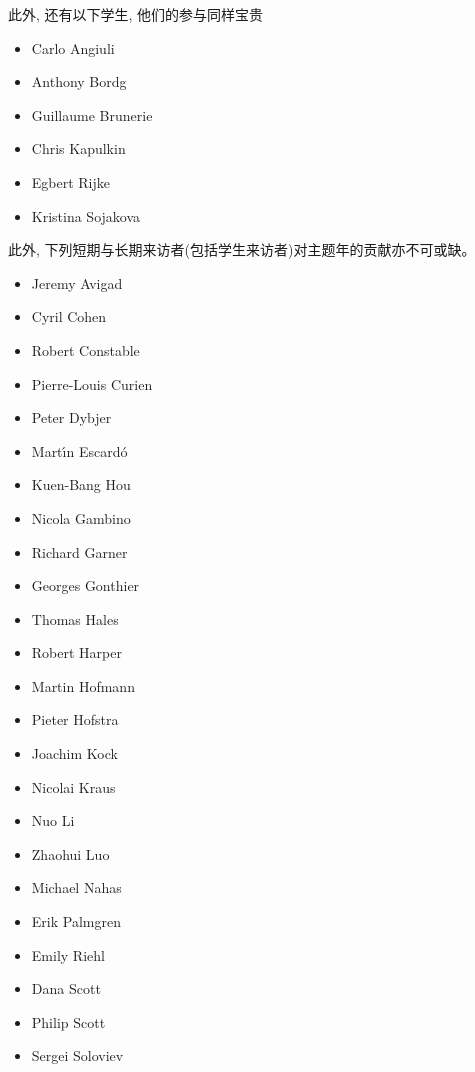 \noindent 此外, 还有以下学生, 他们的参与同样宝贵

\begin{multicols}{\OPTprefacecols}{
\begin{itemize}
\item[] Carlo Angiuli
\item[] Anthony Bordg
\item[] Guillaume Brunerie
\item[] Chris Kapulkin
\item[] Egbert Rijke
\item[] Kristina Sojakova
\end{itemize}
}
\end{multicols}

\noindent 此外, 下列短期与长期来访者(包括学生来访者)对主题年的贡献亦不可或缺。

\begin{multicols}{\OPTprefacecols}{
\begin{itemize}
\item[] Jeremy Avigad
\item[] Cyril Cohen
\item[] Robert Constable
\item[] Pierre-Louis Curien
\item[] Peter Dybjer
\item[] Mart{\'\i}n Escard{\'o}
\item[] Kuen-Bang Hou
\item[] Nicola Gambino
\item[] Richard Garner
\item[] Georges Gonthier
\item[] Thomas Hales
\item[] Robert Harper
\item[] Martin Hofmann
\item[] Pieter Hofstra
\item[] Joachim Kock
\item[] Nicolai Kraus
\item[] Nuo Li
\item[] Zhaohui Luo
\item[] Michael Nahas
\item[] Erik Palmgren
\item[] Emily Riehl
\item[] Dana Scott
\item[] Philip Scott
\item[] Sergei Soloviev
\end{itemize}
}
\end{multicols}

